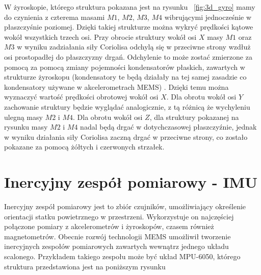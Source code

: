 W żyroskopie, którego struktura pokazana jest na rysunku ~\ref{fig:3d_gyro} mamy do czynienia z czterema masami $M1$, $M2$, $M3$, $M4$ wibrującymi jednocześnie w płaszczyśnie poziomej. Dzięki takiej strukturze można wykryć prędkości kątowe wokół wszystkich trzech osi. Przy obrocie struktury wokół osi $X$ masy $M1$ oraz $M3$ w wyniku zadziałania siły Coriolisa odchylą się w przeciwne strony wzdłuż osi prostopadłej do płaszczyzny drgań. Odchylenie to może zostać zmierzone za pomocą za pomocą zmiany pojemności kondensatorów płaskich, zawartych w strukturze żyroskopu (kondensatory te będą działały na tej samej zasadzie co kondensatory używane w akcelerometrach MEMS) . Dzięki temu można wyznaczyć wartość prędkości obrotowej wokół osi $X$. Dla obrotu wokół osi $Y$ zachowanie struktury będzie wyglądać analogicznie, z tą różnicą że wychyleniu ulegną masy $M2$ i $M4$. Dla obrotu wokół osi $Z$, dla struktury pokazanej na rysunku masy $M2$ i $M4$ nadal będą drgać w dotychczasowej płaszczyźnie, jednak w wyniku działania siły Coriolisa zaczną drgać w przeciwne strony, co zostało pokazane za pomocą żółtych i czerwonych strzałek.



\section{Inercyjny zespół pomiarowy - IMU}

Inercyjny zespół pomiarowy jest to zbiór czujników, umożliwiający określenie orientacji statku powietrznego w przestrzeni. Wykorzystuje on najczęściej połączone pomiary z akcelerometrów i żyroskopów, czasem również magnetometrów. Obecnie rozwój technologii MEMS umożliwił tworzenie inercyjnych zespołów pomiarowych zawartych wewnątrz jednego układu scalonego. Przykładem takiego zespołu może być układ MPU-6050, którego struktura przedstawiona jest na poniższym rysunku

